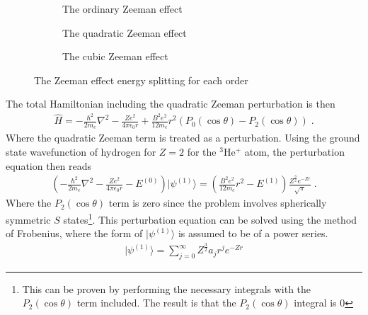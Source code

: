         \begin{figure}[h]
            \centering
            \begin{subfigure}{0.28\linewidth}
                \resizebox{\textwidth}{!}{}
                \caption{The ordinary Zeeman effect}
                \label{fig:a}
            \end{subfigure}
            \hfill
            \begin{subfigure}{0.32\linewidth}
                \resizebox{0.9\textwidth}{!}{}
                \caption{The quadratic Zeeman effect}
                \label{fig:b}
            \end{subfigure}
            \hfill
            \begin{subfigure}{0.28\linewidth}
                \resizebox{\textwidth}{!}{}
                \caption{The cubic Zeeman effect}
                \label{fig:c}
            \end{subfigure}
            \caption{The Zeeman effect energy splitting for each order}
            \label{fig:overall}
        \end{figure}
        \noindent The total Hamiltonian including the quadratic Zeeman perturbation is then 
        \begin{align}
            \hat{H} = - \frac{\hbar^2}{2m_e} \nabla^2 - \frac{Ze^2}{4\pi \epsilon_0 r} + \frac{B^2e^2}{12m_e}r^2 (P_0(\cos \theta) - P_2(\cos \theta))\;. \label{eq:r_sqrd_perturbation}
        \end{align}
        \noindent Where the quadratic Zeeman term is treated as a perturbation. Using the ground state wavefunction of hydrogen for $Z = 2$ for the $^3$He$^+$ atom, the perturbation equation then reads 
        \begin{align}
            \left(- \frac{\hbar^2}{2m_e} \nabla^2 - \frac{Ze^2}{4\pi \epsilon_0 r} - E^{(0)} \right) \vert \psi^{(1)} \rangle = \left(\frac{B^2e^2}{12m_e}r^2 - E^{(1)} \right) \frac{Z^\frac{3}{2} e^{-Zr}}{\sqrt{\pi}}\;.
        \end{align}
        \noindent Where the $P_2(\cos \theta)$ term is zero since the problem involves spherically symmetric $S$ states\footnote{This can be proven by performing the necessary integrals with the $P_2(\cos\theta)$ term included. The result is that the $P_2(\cos \theta)$ integral is 0}. This perturbation equation can be solved using the method of Frobenius, where the form of $\vert \psi^{(1)} \rangle$ is assumed to be of a power series.
        \begin{align}
            \vert \psi^{(1)} \rangle = \sum_{j = 0}^\infty Z^{\frac{3}{2}} a_j r^j e^{-Zr}
        \end{align}
